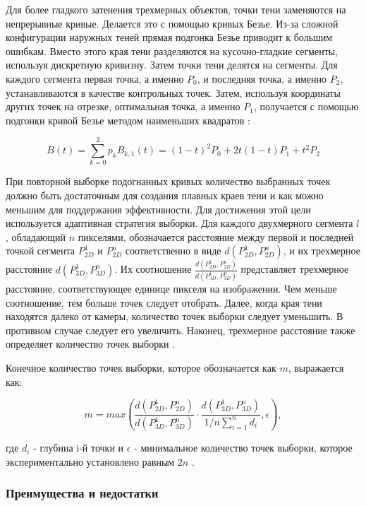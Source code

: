 Для более гладкого затенения трехмерных объектов, точки тени заменяются на непрерывные кривые. Делается это с помощью кривых Безье. Из-за сложной конфигурации наружных теней прямая подгонка Безье приводит к большим ошибкам. Вместо этого края тени разделяются на кусочно-гладкие сегменты, используя дискретную кривизну. Затем точки тени делятся на сегменты. Для каждого сегмента первая точка, а именно $P_0$, и последняя точка, а именно $P_2$, устанавливаются в качестве контрольных точек. Затем, используя координаты других точек на отрезке, оптимальная точка, а именно $P_1$, получается с помощью подгонки кривой Безье методом наименьших квадратов \cite{wei2019simulating}:

\begin{equation}
	B(t) = \sum_{k=0}^{2} p_k B_{k, 1} (t) = (1 - t) ^ 2 P_0 + 2t(1 - t)P_1 + t^2 P_2
\end{equation}

При повторной выборке подогнанных кривых количество выбранных точек должно быть достаточным для создания плавных краев тени и как можно меньшим для поддержания эффективности. Для достижения этой цели используется адаптивная стратегия выборки. Для каждого двухмерного сегмента $l$, обладающий $n$ пикселями, обозначается расстояние между первой и последней точкой сегмента $P_{2D}^1$ и $P_{2D}^n$ соответственно в виде $d(P_{2D}^1, P_{2D}^n)$, и их трехмерное расстояние $d(P_{3D}^1, P_{3D}^n)$. Их соотношение $\frac{d(P_{2D}^1, P_{2D}^n)}{d(P_{3D}^1, P_{3D}^n)}$ представляет трехмерное расстояние, соответствующее единице пикселя на изображении. Чем меньше соотношение, тем больше точек следует отобрать. Далее, когда края тени находятся далеко от камеры, количество точек выборки следует уменьшить. В противном случае следует его увеличить. Наконец, трехмерное расстояние также определяет количество точек выборки \cite{wei2019simulating}.

Конечное количество точек выборки, которое обозначается как $m$, выражается как:

\begin{equation}
	m = max(\frac{d(P_{2D}^1, P_{2D}^n)}{d(P_{3D}^1, P_{3D}^n)} \cdot \frac{d(P_{3D}^1, P_{3D}^n)}{1/n \sum_{i=1}^{n} d_i}, \epsilon),
\end{equation}

где $d_i$ - глубина i-й точки и $\epsilon$ - минимальное количество точек выборки, которое экспериментально установлено равным $2n$ \cite{wei2019simulating}.

\subsubsection*{Преимущества и недостатки}


